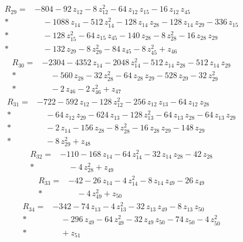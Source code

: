 \documentclass[10pt]{article}
\begin{document}
\begin{align*}
R_{29}={}& - 804 - 92\,z_{12} - 8\,z_{12}^{2} - 64\,z_{12}\,z_{15} - 16\,z_{12}\,z_{45} \\*
&\quad - 1088\,z_{14} - 512\,z_{14}^{2} - 128\,z_{14}\,z_{28} - 128\,z_{14}\,z_{29} - 336\,z_{15} \\*
&\quad - 128\,z_{15}^{2} - 64\,z_{15}\,z_{45} - 140\,z_{28} - 8\,z_{28}^{2} - 16\,z_{28}\,z_{29} \\*
&\quad - 132\,z_{29} - 8\,z_{29}^{2} - 84\,z_{45} - 8\,z_{45}^{2} + z_{46}
\end{align*}
\begin{align*}
R_{30}={}& - 2304 - 4352\,z_{14} - 2048\,z_{14}^{2} - 512\,z_{14}\,z_{28} - 512\,z_{14}\,z_{29} \\*
&\quad - 560\,z_{28} - 32\,z_{28}^{2} - 64\,z_{28}\,z_{29} - 528\,z_{29} - 32\,z_{29}^{2} \\*
&\quad - 2\,z_{46} - 2\,z_{46}^{2} + z_{47}
\end{align*}
\begin{align*}
R_{31}={}& - 722 - 592\,z_{12} - 128\,z_{12}^{2} - 256\,z_{12}\,z_{13} - 64\,z_{12}\,z_{28} \\*
&\quad - 64\,z_{12}\,z_{29} - 624\,z_{13} - 128\,z_{13}^{2} - 64\,z_{13}\,z_{28} - 64\,z_{13}\,z_{29} \\*
&\quad - 2\,z_{14} - 156\,z_{28} - 8\,z_{28}^{2} - 16\,z_{28}\,z_{29} - 148\,z_{29} \\*
&\quad - 8\,z_{29}^{2} + z_{48}
\end{align*}
\begin{align*}
R_{32}={}& - 110 - 168\,z_{14} - 64\,z_{14}^{2} - 32\,z_{14}\,z_{28} - 42\,z_{28} \\*
&\quad - 4\,z_{28}^{2} + z_{49}
\end{align*}
\begin{align*}
R_{33}={}& - 42 - 26\,z_{14} - 4\,z_{14}^{2} - 8\,z_{14}\,z_{49} - 26\,z_{49} \\*
&\quad - 4\,z_{49}^{2} + z_{50}
\end{align*}
\begin{align*}
R_{34}={}& - 342 - 74\,z_{13} - 4\,z_{13}^{2} - 32\,z_{13}\,z_{49} - 8\,z_{13}\,z_{50} \\*
&\quad - 296\,z_{49} - 64\,z_{49}^{2} - 32\,z_{49}\,z_{50} - 74\,z_{50} - 4\,z_{50}^{2} \\*
&\quad + z_{51}
\end{align*}
\end{document}
